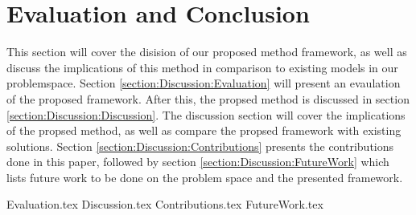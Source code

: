 \chapter{Evaluation and Conclusion}

\label{section:Discussion}

This section will cover the disision of our proposed method framework, as well as discuss the implications of this method in comparison to existing models in our problemspace.
Section \ref{section:Discussion:Evaluation} will present an evaulation of the proposed framework.
After this, the propsed method is discussed in section \ref{section:Discussion:Discussion}.
The discussion section will cover the implications of the propsed method, as well as compare the propsed framework with existing solutions.
Section \ref{section:Discussion:Contributions} presents the contributions done in this paper,
followed by section \ref{section:Discussion:FutureWork} which lists future work to be done on the problem space and the presented framework.

{Evaluation.tex}
{Discussion.tex}
{Contributions.tex}
{FutureWork.tex}
